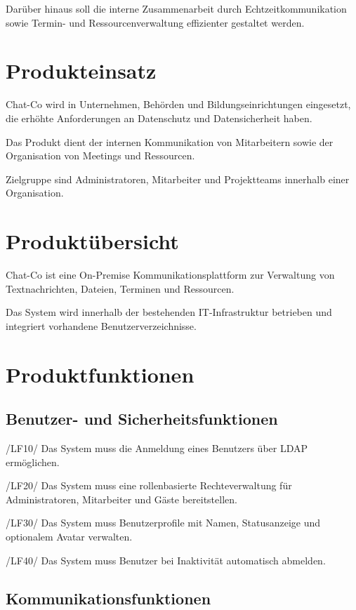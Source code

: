 \documentclass[12pt,a4paper]{extarticle}
\begin{document}
Darüber hinaus soll die interne Zusammenarbeit durch Echtzeitkommunikation sowie Termin- und Ressourcenverwaltung effizienter gestaltet werden.

\section{Produkteinsatz}

Chat-Co wird in Unternehmen, Behörden und Bildungseinrichtungen eingesetzt, die erhöhte Anforderungen an Datenschutz und Datensicherheit haben.

Das Produkt dient der internen Kommunikation von Mitarbeitern sowie der Organisation von Meetings und Ressourcen.

Zielgruppe sind Administratoren, Mitarbeiter und Projektteams innerhalb einer Organisation.

\newpage
\section{Produktübersicht}

Chat-Co ist eine On-Premise Kommunikationsplattform zur Verwaltung von Textnachrichten, Dateien, Terminen und Ressourcen.

Das System wird innerhalb der bestehenden IT-Infrastruktur betrieben und integriert vorhandene Benutzerverzeichnisse.

\section{Produktfunktionen}

\subsection*{Benutzer- und Sicherheitsfunktionen}

/LF10/ Das System muss die Anmeldung eines Benutzers über LDAP ermöglichen.  

/LF20/ Das System muss eine rollenbasierte Rechteverwaltung für Administratoren, Mitarbeiter und Gäste bereitstellen.  

/LF30/ Das System muss Benutzerprofile mit Namen, Statusanzeige und optionalem Avatar verwalten.  

/LF40/ Das System muss Benutzer bei Inaktivität automatisch abmelden.  

\subsection*{Kommunikationsfunktionen}
\end{document}
